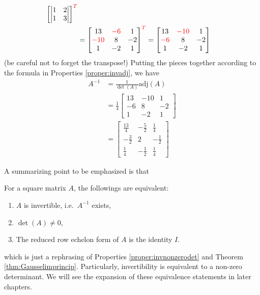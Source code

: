 \begin{solution}
\begin{align*}
\begin{bmatrix*}[r]
\begin{vmatrix}
1 & 2 \\
1 & 3 
\end{vmatrix} 
\end{bmatrix*}^{\color{red}{T}} \\
&= 
\begin{bmatrix}
13 & \textcolor{red}{-6} & 1 \\
\textcolor{red}{-10} & 8 & -2 \\
1 & -2 & 1
\end{bmatrix}^{\color{red}{T}} = 
\begin{bmatrix}
13 & \textcolor{red}{-10} & 1 \\
\textcolor{red}{-6} & 8 & -2 \\
1 & -2 & 1
\end{bmatrix}
\end{align*}
(be careful not to forget the transpose!) Putting the pieces together according to the formula in Properties \ref{proper:invadj}, we have
\begin{align*}
A^{-1} &= \frac{1}{\det(A)}\text{adj}(A) \\
&= \frac{1}{4}
\begin{bmatrix}
13 & -10 & 1 \\
-6 & 8 & -2 \\
1 & -2 & 1
\end{bmatrix} \\
&= 
\begin{bmatrix}
\frac{13}{4} & -\frac{5}{2} & \frac{1}{4} \\[3pt]
-\frac{3}{2} & 2 & -\frac{1}{2} \\[3pt]
\frac{1}{4} & -\frac{1}{2} & \frac{1}{4}
\end{bmatrix}
\end{align*}
\end{solution}
A summarizing point to be emphasized is that
\begin{thm}
\label{thm:equiv1}
For a square matrix $A$, the followings are equivalent:
\begin{enumerate}[label=(\alph*)]
\item $A$ is invertible, i.e.\ $A^{-1}$ exists,
\item $\det(A) \neq 0$,
\item The reduced row echelon form of $A$ is the identity $I$.
\end{enumerate}
\end{thm}
which is just a rephrasing of Properties \ref{proper:invnonzerodet} and Theorem \ref{thm:Gausselimprincip}. 
Particularly, invertibility is equivalent to a non-zero determinant. We will see the expansion of these equivalence statements in later chapters.

